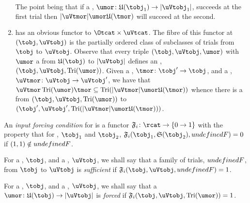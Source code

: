 \documentclass[%
a4paper,%
arxiv,%
defaults
]{myclass}
\begin{document}
\begin{remark}
\begin{enumerate}
\begin{centre}
\end{centre}

The point being that if a \umor, \(\umor \colon \ufunc(\tobj_1) \to \abs{\uVtobj_1}\), succeeds at the first trial then \(\abs{\uVtmor} \umor \ufunc(\tmor)\) will succeed at the second.

\item \rcatu has an obvious functor to \(\Otcat \times \uVtcat\).
The fibre of this functor at \((\tobj, \uVtobj)\) is the partially ordered class of subclasses of trials from \(\tobj\) to \(\uVtobj\).
Observe that every triple \((\tobj, \uVtobj, \umor)\) with \(\umor\) a \umor from \(\ufunc(\tobj)\) to \(\abs{\uVtobj}\) defines an \robj, \((\tobj, \uVtobj, \trials{\umor})\).
Given a \tmor, \(\tmor \colon \tobj' \to \tobj\), and a \uVtmor, \(\uVtmor \colon \uVtobj \to \uVtobj'\), we have that \(\uVtmor \trials{\umor} \tmor \subseteq \trials{\abs{\uVtmor} \umor \ufunc(\tmor)}\) whence there is a \rmor from \((\tobj, \uVtobj, \trials{\umor})\) to \((\tobj', \uVtobj', \trials{\abs{\uVtmor} \umor \ufunc(\tmor)})\).
\end{enumerate}
\end{remark}

\begin{defn}
\label{def:forcing}
An \emph{input forcing condition} for \uVtobjs is a functor \(\iforce \colon \rcat \to \{0 \to 1\}\) with the property that for \tobjs, \(\tobj_1\) and \(\tobj_2\), \(\iforce(\tobj_1, \sfunc(\tobj_2), \m{F}) = 0\) if \((1,1) \notin \m{F}\).

For a \tobj, \(\tobj\), and a \uVtobj, \(\uVtobj\), we shall say that a family of trials, \(\m{F}\), from \(\tobj\) to \(\uVtobj\) is \emph{sufficient} if \(\iforce(\tobj, \uVtobj, \m{F}) = 1\).

For a \tobj, \(\tobj\), and a \uVtobj, \(\uVtobj\), we shall say that a \umor \(\umor \colon \ufunc(\tobj) \to \abs{\uVtobj}\) is \emph{forced} if \(\iforce(\tobj, \uVtobj, \trials{\umor}) = 1\).
\end{defn}
\end{document}
